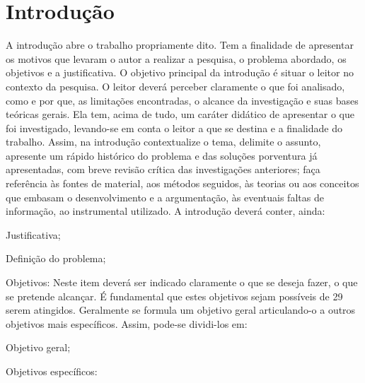\chapter{Introdução}
    
    A introdução abre o trabalho propriamente dito. Tem a finalidade de apresentar os motivos que levaram o autor a realizar a pesquisa, o problema abordado, os objetivos e a justificativa. O objetivo principal da introdução é situar o leitor no contexto da pesquisa. O leitor deverá perceber claramente o que foi analisado, como e por que, as limitações encontradas, o alcance da investigação e suas bases teóricas gerais. Ela tem, acima de tudo, um caráter didático de apresentar o que foi investigado, levando-se em conta o leitor a que se destina e a finalidade do trabalho. Assim, na introdução contextualize o tema, delimite o assunto, apresente um rápido histórico do problema e das soluções porventura já apresentadas, com breve revisão crítica das investigações anteriores; faça referência às fontes de material, aos métodos seguidos, às teorias ou aos conceitos que embasam o desenvolvimento e a argumentação, às eventuais faltas de informação, ao instrumental utilizado.
    A introdução deverá conter, ainda:
    
    \begin{alineas}
    	
    	\item Justificativa;
    	
    	\item Definição do problema;
    	    	
    	\item Objetivos: Neste item deverá ser indicado claramente o que se deseja fazer, o que se pretende alcançar. É fundamental que estes objetivos sejam possíveis de 29 serem atingidos. Geralmente se formula um objetivo geral articulando-o a outros objetivos mais específicos. Assim, pode-se dividi-los em:
    	
	    	\subitem Objetivo geral;
	    	
	    	\subitem Objetivos específicos: 
	    	
    \end{alineas}
    
